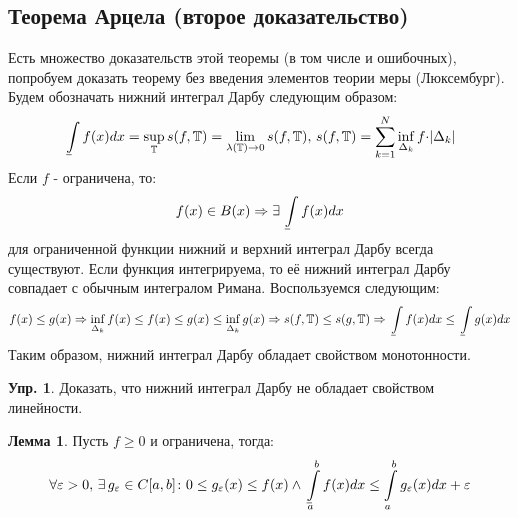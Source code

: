 \documentclass[12pt]{article}
\newcommand{\MTB}{\mathbb{T}}
\newcommand{\VE}{\varepsilon}
\theoremstyle{definition}
\newtheorem{exrc}{Упр.}
\newtheorem{lemma}{Лемма}
\newcommand{\ddint}[2]{\displaystyle\int\limits_{#1}^{#2}}
\def\lowint{\mkern3mu\underline{\vphantom{\intop}\mkern7mu}\mkern-10mu\int}
\begin{document}
\newpage

\subsection*{Теорема Арцела (второе доказательство)}
Есть множество доказательств этой теоремы (в том числе и ошибочных), попробуем доказать теорему без введения элементов теории меры (Люксембург). Будем обозначать нижний интеграл Дарбу следующим образом:
$$
	\lowint f(x)dx = \sup\limits_{\MTB}s(f,\MTB) = \lim\limits_{\lambda(\MTB) \to 0} s(f,\MTB), \, s(f, \MTB) = \sum\limits_{k = 1}^{N} \inf\limits_{\Delta_k}f{\cdot}|\Delta_k|
$$
Если $f$ - ограничена, то:
$$
	f(x) \in B(x) \Rightarrow\exists \, \displaystyle \lowint f(x)dx
$$ 
для ограниченной функции нижний и верхний интеграл Дарбу всегда существуют. Если функция интегрируема, то её нижний интеграл Дарбу совпадает с обычным интегралом Римана. Воспользуемся следующим:
$$
	f(x) \leq g(x) \Rightarrow \inf\limits_{\Delta_k} f(x) \leq f(x) \leq g(x) \leq \inf\limits_{\Delta_k} g(x)\Rightarrow s(f,\MTB) \leq s(g,\MTB) \Rightarrow \lowint f(x)dx \leq \lowint g(x) dx
$$
Таким образом, нижний интеграл Дарбу обладает свойством монотонности.
\begin{exrc}
	Доказать, что нижний интеграл Дарбу не обладает свойством линейности.
\end{exrc}
\begin{lemma}
	Пусть $f \geq 0$ и ограничена, тогда:
	$$
		\forall \VE> 0, \, \exists \, g_\VE \in C[a,b] \colon 0 \leq g_\VE(x) \leq f(x) \wedge \lowint\limits_{a}^{b} f(x)dx \leq \ddint{a}{b}g_\VE(x)dx + \VE
	$$
\end{lemma}
\end{document}
